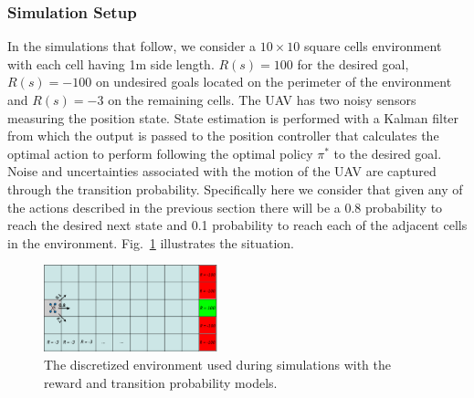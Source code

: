 \documentclass[letterpaper, 10 pt, conference]{ieeeconf}  %
\begin{document}
\subsubsection{Simulation Setup}
In the simulations that follow, we consider a $10\times10$ square cells environment with each cell having 1m side length. $R(s) = 100$ for the desired goal, $R(s) = -100$ on undesired goals located on the perimeter of the environment and $R(s) = -3$ on the remaining cells.  The UAV has two noisy sensors measuring the position state. State estimation is performed with a Kalman filter from which the output is passed to the position controller that calculates the optimal action to perform following the optimal policy $\pi^*$ to the desired goal. Noise and uncertainties associated with the motion of the UAV are captured through the transition probability. Specifically here we consider that given any of the actions described in the previous section there will be a 0.8 probability to reach the desired next state and 0.1 probability to reach each of the adjacent cells in the environment. Fig.~\ref{fig:sim-env} illustrates the situation.
%
\begin{figure}[h]
\centering
\includegraphics[width=0.45\textwidth]{sim-env}
\caption{The discretized environment used during simulations with the reward and transition probability models.} 
 \label{fig:sim-env}
\end{figure}
\end{document}
